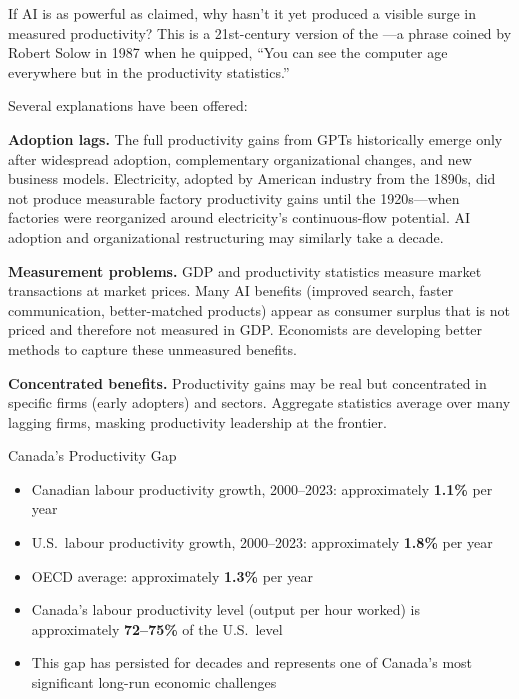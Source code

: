If AI is as powerful as claimed, why hasn't it yet produced a visible surge in measured productivity? This is a 21st-century version of the ---a phrase coined by Robert Solow in 1987 when he quipped, ``You can see the computer age everywhere but in the productivity statistics.''

Several explanations have been offered:

\textbf{Adoption lags.} The full productivity gains from GPTs historically emerge only after widespread adoption, complementary organizational changes, and new business models. Electricity, adopted by American industry from the 1890s, did not produce measurable factory productivity gains until the 1920s---when factories were reorganized around electricity's continuous-flow potential. AI adoption and organizational restructuring may similarly take a decade.

\textbf{Measurement problems.} GDP and productivity statistics measure market transactions at market prices. Many AI benefits (improved search, faster communication, better-matched products) appear as consumer surplus that is not priced and therefore not measured in GDP. Economists are developing better methods to capture these unmeasured benefits.

\textbf{Concentrated benefits.} Productivity gains may be real but concentrated in specific firms (early adopters) and sectors. Aggregate statistics average over many lagging firms, masking productivity leadership at the frontier.

\begin{databox}{Canada's Productivity Gap}
\begin{itemize}
  \item Canadian labour productivity growth, 2000--2023: approximately \textbf{1.1\%} per year
  \item U.S.\ labour productivity growth, 2000--2023: approximately \textbf{1.8\%} per year
  \item OECD average: approximately \textbf{1.3\%} per year
  \item Canada's labour productivity level (output per hour worked) is approximately \textbf{72--75\%} of the U.S.\ level
  \item This gap has persisted for decades and represents one of Canada's most significant long-run economic challenges
\end{itemize}
\end{databox}

